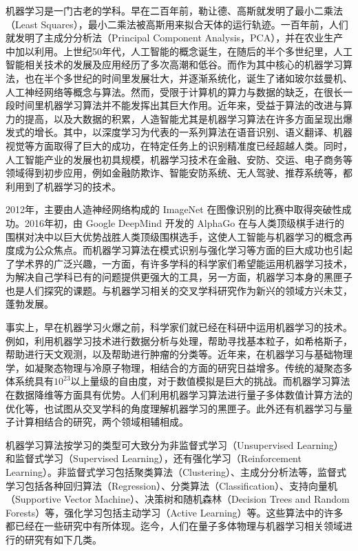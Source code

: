 机器学习是一门古老的学科。早在二百年前，勒让德、高斯就发明了最小二乘法（Least Squares），最小二乘法被高斯用来拟合天体的运行轨迹。一百年前，人们就发明了主成分分析法（Principal Component Analysis，PCA）\cite{pearson1901,hotelling1933}，并在农业生产中加以利用\cite{pcabook}。上世纪50年代，人工智能的概念诞生，在随后的半个多世纪里，人工智能相关技术的发展及应用经历了多次高潮和低谷。而作为其中核心的机器学习算法，也在半个多世纪的时间里发展壮大，并逐渐系统化，诞生了诸如玻尔兹曼机、人工神经网络等概念与算法。然而，受限于计算机的算力与数据的缺乏，在很长一段时间里机器学习算法并不能发挥出其巨大作用。近年来，受益于算法的改进与算力的提高，以及大数据的积累，人造智能尤其是机器学习算法在许多方面呈现出爆发式的增长。其中，以深度学习\cite{dl2015}为代表的一系列算法在语音识别、语义翻译、机器视觉等方面取得了巨大的成功，在特定任务上的识别精准度已经超越人类。同时，人工智能产业的发展也初具规模，机器学习技术在金融、安防、交运、电子商务等领域得到初步应用，例如金融防欺诈、智能安防系统、无人驾驶、推荐系统等，都利用到了机器学习的技术。


2012年，主要由人造神经网络构成的 ImageNet 在图像识别的比赛中取得突破性成功\cite{imagenet}。2016年初，由 Google DeepMind 开发的 AlphaGo 在与人类顶级棋手进行的围棋对决中以巨大优势战胜人类顶级围棋选手，这使人工智能与机器学习的概念再度成为公众焦点。而机器学习算法在模式识别与强化学习等方面的巨大成功也引起了学术界的广泛兴趣，一方面，有许多学科的科学家们希望能运用机器学习技术，为解决自己学科已有的问题提供更强大的工具，另一方面，机器学习本身的黑匣子也是人们探究的课题。与机器学习相关的交叉学科研究作为新兴的领域方兴未艾，蓬勃发展\cite{mlrev1903}。

事实上，早在机器学习火爆之前，科学家们就已经在科研中运用机器学习的技术。例如，利用机器学习技术进行数据分析与处理，帮助寻找基本粒子，如希格斯子，帮助进行天文观测，以及帮助进行肿瘤的分类等。近年来，在机器学习与基础物理学，如凝聚态物理与冷原子物理，相结合的方面的研究日益增多。传统的凝聚态多体系统具有$10^{23}$以上量级的自由度，对于数值模拟是巨大的挑战。而机器学习算法在数据降维等方面具有优势。人们利用机器学习算法进行量子多体数值计算方法的优化等，也试图从交叉学科的角度理解机器学习的黑匣子。此外还有机器学习与量子计算相结合的研究\cite{qml2017,qai2017}，两个领域相辅相成。

机器学习算法按学习的类型可大致分为\cite{prmlbook}非监督式学习（Unsupervised Learning）和监督式学习（Supervised Learning），还有强化学习（Reinforcement Learning）。非监督式学习包括聚类算法（Clustering）、主成分分析法等，监督式学习包括各种回归算法（Regression）、分类算法（Classification）、支持向量机（Supportive Vector Machine）、决策树和随机森林（Decision Trees and Random Forests）等，强化学习包括主动学习（Active Learning）等。这些算法中的许多都已经在一些研究中有所体现。迄今，人们在量子多体物理与机器学习相关领域进行的研究有如下几类。

